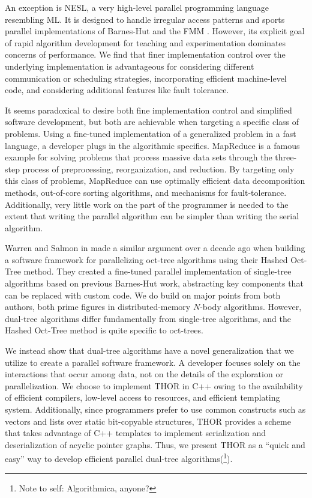\documentclass[twoside,leqno,twocolumn]{article}
\newcommand{\authornote}[1]{(\footnote{Note to self: #1})}
\newcommand{\authorsnote}[1]{\authornote{#1}}
\begin{document}
An exception is NESL, a very high-level parallel programming language resembling ML.
It is designed to handle irregular access patterns and sports parallel implementations of Barnes-Hut and the FMM \cite{blelloch_nbody}.
However, its explicit goal of rapid algorithm development for teaching and experimentation dominates concerns of performance.
We find that finer implementation control over the underlying implementation is advantageous for considering different communication or scheduling strategies, incorporating efficient machine-level code, and considering additional features like fault tolerance.

It seems paradoxical to desire both fine implementation control and simplified software development, but both are achievable when targeting a specific class of problems.
Using a fine-tuned implementation of a generalized problem in a fast language, a developer plugs in the algorithmic specifics.
MapReduce \cite{mapreduce} is a famous example for solving problems that process massive data sets through the three-step process of preprocessing, reorganization, and reduction.
By targeting only this class of problems, MapReduce can use optimally efficient data decomposition methods, out-of-core sorting algorithms, and mechanisms for fault-tolerance.
Additionally, very little work on the part of the programmer is needed to the extent that writing the parallel algorithm can be simpler than writing the serial algorithm.

Warren and Salmon in \cite{warren95portable} made a similar argument over a decade ago when building a software framework for parallelizing oct-tree algorithms using their Hashed Oct-Tree method.
They created a fine-tuned parallel implementation of single-tree algorithms based on previous Barnes-Hut work, abstracting key components that can be replaced with custom code.
We do build on major points from both authors, both prime figures in distributed-memory $N$-body algorithms.
However, dual-tree algorithms differ fundamentally from single-tree algorithms, and the Hashed Oct-Tree method is quite specific to oct-trees.

We instead show that dual-tree algorithms have a novel generalization that we utilize to create a parallel software framework.
A developer focuses solely on the interactions that occur among data, not on the details of the exploration or parallelization.
We choose to implement THOR in C++ owing to the availability of efficient compilers, low-level access to resources, and efficient templating system.
Additionally, since programmers prefer to use common constructs such as vectors and lists over static bit-copyable structures, THOR provides a scheme that takes advantage of C++ templates to implement serialization and deserialization of acyclic pointer graphs.
Thus, we present THOR as a ``quick and easy'' way to develop efficient parallel dual-tree algorithms\authorsnote{Algorithmica, anyone?}.
\end{document}

